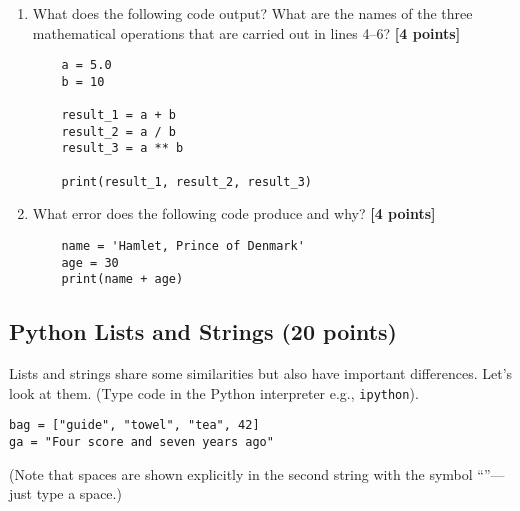 \documentclass[letterpaper]{scrartcl}
\newcommand{\points}[1]{\textbf{[#1 points]}}
\newenvironment{enuma}{\begin{enumerate}[label=(\alph*)]}{\end{enumerate}}
\begin{document}
\begin{enuma}
\item What does the following code output? What are the names of the three
  mathematical operations that are carried out in lines 4--6? \points{4}
  \begin{verbatim}
    a = 5.0
    b = 10
    
    result_1 = a + b
    result_2 = a / b
    result_3 = a ** b
    
    print(result_1, result_2, result_3)
  \end{verbatim}
\item What error does the following code produce and why? \points{4}
  \begin{verbatim}
    name = 'Hamlet, Prince of Denmark'
    age = 30
    print(name + age)
  \end{verbatim}
\end{enuma}


\subsection{Python Lists and Strings (20 points)}

Lists and strings share some similarities but also have important
differences. Let's look at them. (Type code in the Python interpreter
e.g., \texttt{ipython}).

\begin{verbatim}
bag = ["guide", "towel", "tea", 42]
ga = "Four score and seven years ago"
\end{verbatim}

(Note that spaces are shown explicitly in the second string with the
symbol ``\textvisiblespace''---just type a space.)
\end{document}
